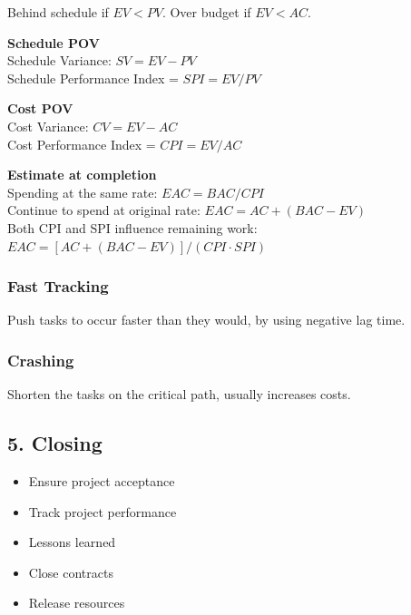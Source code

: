 Behind schedule if $EV < PV$.
Over budget if $EV < AC$.

\textbf{Schedule POV}\\
Schedule Variance: $SV = EV - PV$\\
Schedule Performance Index = $SPI = EV/PV$

\textbf{Cost POV}\\
Cost Variance: $CV = EV - AC$\\
Cost Performance Index = $CPI = EV/AC$

\textbf{Estimate at completion}\\
Spending at the same rate: $EAC = BAC/CPI$\\
Continue to spend at original rate: $EAC = AC + (BAC - EV)$\\
Both CPI and SPI influence remaining work: $EAC = [AC + (BAC - EV)] / (CPI \cdot SPI)$

\subsubsection{Fast Tracking}
Push tasks to occur faster than they would, by using negative lag time.

\subsubsection{Crashing}
Shorten the tasks on the critical path, usually increases costs.

\subsection{5. Closing}
\begin{itemize}
    \item Ensure project acceptance
    \item Track project performance
    \item Lessons learned
    \item Close contracts
    \item Release resources
\end{itemize}
